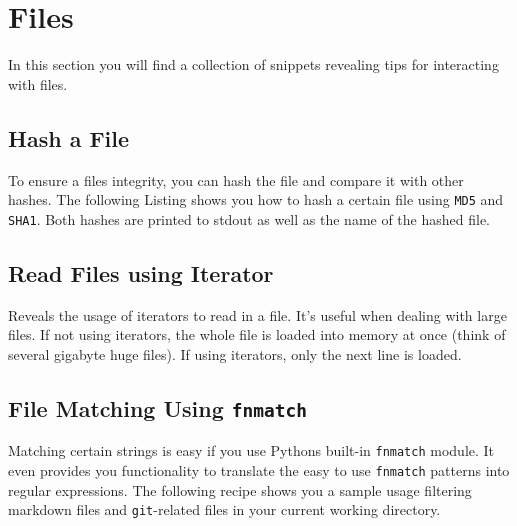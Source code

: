 
\section{Files}

In this section you will find a collection of snippets revealing tips for interacting with files.


\subsection{Hash a File}

To ensure a files integrity, you can hash the file and compare it with other hashes.
The following Listing shows you how to hash a certain file using \lstinline{MD5} and \lstinline{SHA1}.
Both hashes are printed to stdout as well as the name of the hashed file.




\subsection{Read Files using Iterator}

Reveals the usage of iterators to read in a file.
It's useful when dealing with large files.
If not using iterators, the whole file is loaded into memory at once (think of several gigabyte huge files).
If using iterators, only the next line is loaded.




\subsection{File Matching Using \lstinline{fnmatch}}

Matching certain strings is easy if you use Pythons built-in \lstinline{fnmatch} module.
It even provides you functionality to translate the easy to use \lstinline{fnmatch} patterns into regular expressions.
The following recipe shows you a sample usage filtering markdown files and \lstinline{git}-related files in your current working directory.



